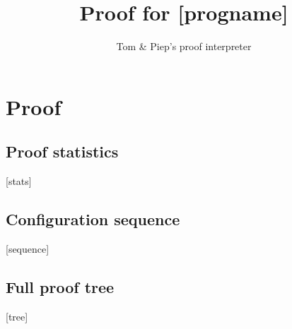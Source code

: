 \documentclass{article}
\begin{document}
\title{Proof for [progname]}
\author{Tom \& Piep's proof interpreter}

\maketitle

\section{Proof}
\subsection{Proof statistics}
[stats]

\subsection{Configuration sequence}
[sequence]

\subsection{Full proof tree}
[tree]
\end{document}
